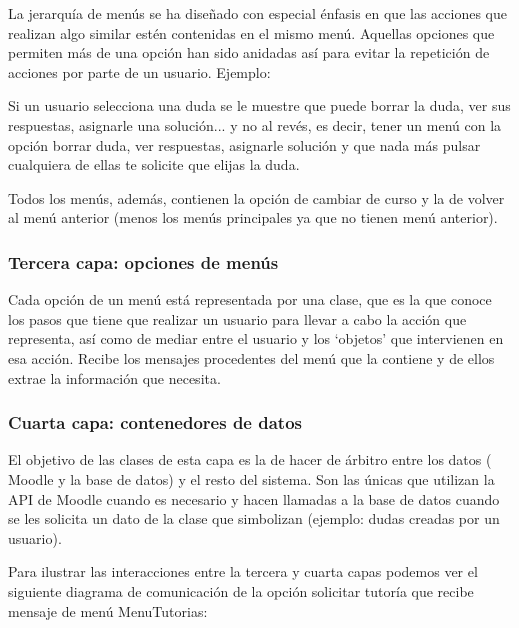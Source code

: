 La jerarquía de menús se ha diseñado con especial énfasis en que las acciones que realizan algo similar estén contenidas en el mismo menú. Aquellas opciones que permiten más de una opción han sido anidadas así para evitar la repetición de acciones por parte de un usuario. Ejemplo:\par
Si un usuario selecciona una duda se le muestre que puede borrar la duda, ver sus respuestas, asignarle una solución... y no al revés, es decir,  tener un menú con la opción borrar duda, ver respuestas, asignarle solución y que nada más pulsar cualquiera de ellas te solicite que elijas la duda.
\par
Todos los menús, además, contienen la opción de cambiar de curso y  la de volver al menú anterior (menos los menús principales ya que no tienen menú anterior).





\subsubsection{Tercera capa: opciones de menús}


Cada opción de un menú está representada por una clase, que es la que conoce los pasos que tiene que realizar un usuario para llevar a cabo la acción que representa, así como de mediar entre el usuario y los \enquote*{objetos} que intervienen en esa acción. Recibe los mensajes procedentes del menú que la contiene y de ellos extrae la información que necesita.


\subsubsection{Cuarta capa: contenedores de datos}
El objetivo de las clases de esta capa es la de hacer de árbitro entre los datos ( Moodle y la base de datos) y el resto del sistema. Son las únicas que utilizan la API de Moodle cuando es necesario y hacen llamadas a la base de datos cuando se les solicita un dato de la clase que simbolizan (ejemplo: dudas creadas por un usuario).

Para ilustrar las interacciones entre la tercera y cuarta capas podemos ver el siguiente diagrama de comunicación de la opción solicitar tutoría que recibe mensaje de menú MenuTutorias:


